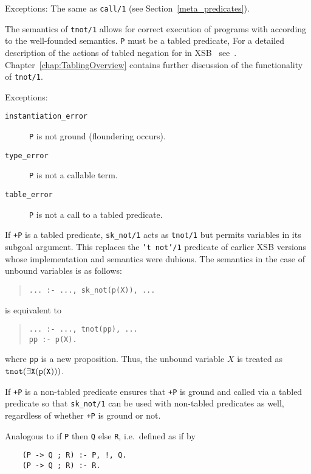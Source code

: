 \begin{description}
    Exceptions: The same as {\tt call/1} 
		(see Section~\ref{meta_predicates}).

\label{tnot/1}
    The semantics of {\tt tnot/1} allows for correct execution of
    programs with according to the well-founded semantics.  {\tt P}
    must be a tabled predicate, 
%
% 
%
    For a detailed description of the actions of tabled negation for
    in XSB \version\ see~\cite{SaSw98, SaSW96}.
    Chapter~\ref{chap:TablingOverview} contains further discussion of the
    functionality of {\tt tnot/1}.

    Exceptions:
    \begin{description}
    \item[{\tt instantiation\_error}]
	{\tt P} is not ground (floundering occurs).
    \item[{\tt type\_error}]
	{\tt P} is not a callable term.
    \item[{\tt table\_error}]
	{\tt P} is not a call to a tabled predicate.
    \end{description}


If {\tt +P} is a tabled predicate, {\tt sk\_not/1} acts as {\tt tnot/1}
    but permits variables in its subgoal argument.  This replaces the
    {\tt 't not'/1} predicate of earlier XSB versions whose
    implementation and semantics were dubious. The semantics in the
    case of unbound variables is as follows: 
\begin{quote} 
\tt ... :- ...,~sk\_not(p(X)),~...  \end{quote} 
is equivalent to 
\begin{quote}
 \tt ... :- ..., tnot(pp),~...\\ pp :- p(X).
\end{quote} 
where {\tt pp} is a new proposition. Thus, the unbound variable $X$ is
treated as $\tt tnot(\exists X (p(X)))$.

If {\tt +P} is a non-tabled predicate ensures that {\tt +P} is ground
and called via a tabled predicate so that {\tt sk\_not/1} can be used
with non-tabled predicates as well, regardless of whether {\tt +P} is
ground or not.

    Analogous to if {\tt P} then {\tt Q} else {\tt R}, i.e.\ defined as 
    if by
	\begin{center}
	\begin{minipage}{2.10in}
	\begin{verbatim}
	(P -> Q ; R) :- P, !, Q.
	(P -> Q ; R) :- R.
	\end{verbatim}
	\end{minipage}
	\end{center}


\end{description}
